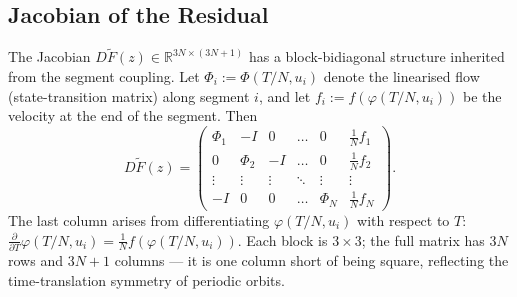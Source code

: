 \documentclass[11pt,a4paper]{article}
\begin{document}
\subsection{Jacobian of the Residual}
The Jacobian $D\tilde{F}(z) \in \mathbb{R}^{3N \times (3N+1)}$ has a
block-bidiagonal structure inherited from the segment coupling.  Let
$\Phi_i := \Phi(T/N, u_i)$ denote the linearised flow (state-transition
matrix) along segment $i$, and let
$f_i := f(\varphi(T/N, u_i))$ be the velocity at the end of the segment.
Then
\begin{equation}\label{eq:jacobian}
  D\tilde{F}(z) =
  \begin{pmatrix}
    \Phi_1 & -I & 0      & \dots  & 0      & \frac{1}{N}f_1 \\[4pt]
    0      & \Phi_2 & -I & \dots  & 0      & \frac{1}{N}f_2 \\[4pt]
    \vdots & \vdots & \vdots & \ddots & \vdots & \vdots \\[4pt]
    -I     & 0      & 0      & \dots  & \Phi_N & \frac{1}{N}f_N
  \end{pmatrix}.
\end{equation}
The last column arises from differentiating $\varphi(T/N, u_i)$ with respect
to $T$: $\frac{\partial}{\partial T}\varphi(T/N, u_i)
= \frac{1}{N}f(\varphi(T/N, u_i))$.  Each block is $3 \times 3$; the full
matrix has $3N$ rows and $3N+1$ columns --- it is one column short of being
square, reflecting the time-translation symmetry of periodic orbits.
\end{document}
